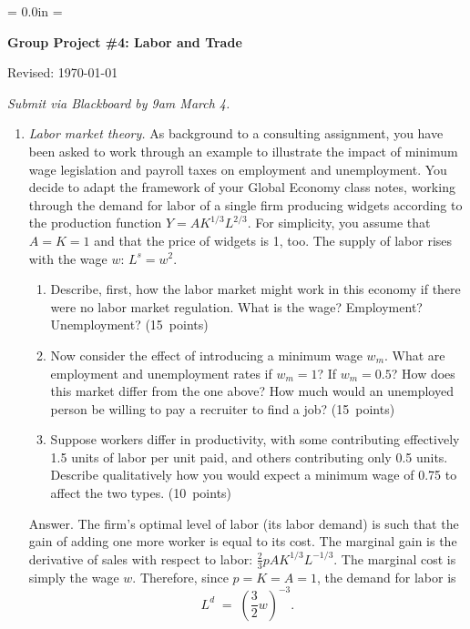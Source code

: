 \documentclass[letterpaper,12pt]{article}
\def\HeadName{Group Project \#4}
\begin{document}
\parindent = 0.0in
\parskip = \bigskipamount
\thispagestyle{empty}%
\Head

\centerline{\large \bf \HeadName:  Labor and Trade}%
\centerline{Revised:  \today}

\medskip
{\it Submit via Blackboard by 9am March 4.}


\begin{enumerate}

\item {\it Labor market theory.\/} As background to a
consulting assignment, you have been asked to work through an
example to illustrate the impact of
minimum wage legislation and payroll taxes on employment and
unemployment. You decide to adapt the framework of your 
{Global Economy} class notes, 
working through the demand for labor
of a single firm producing widgets according to the production
function $Y= A K^{1/3}L^{2/3}$. For simplicity, you assume that
$A=K=1$ and that the price of widgets is 1, too.  The supply of
labor rises with the wage $w$: $L^{s}=w^{2}$.
%
\begin{enumerate}

\item Describe, first, how the labor market might work in this
economy if there were no labor market regulation.  
What is the wage?
Employment? Unemployment?  (15~points)

\item Now consider the effect of introducing a minimum wage
$w_{m}$.  What are employment and unemployment rates if $w_{m}=1$?
If $w_{m}=0.5$?  How does this market differ from the one above?
How much would an unemployed person be willing to pay a recruiter
to find a job?  
(15~points)

\item Suppose workers differ in productivity, 
with some contributing effectively 1.5 units of labor 
per unit paid, and others contributing only 0.5 units.  
Describe qualitatively how  you would expect a minimum wage of 0.75 
to affect the two types.  
(10~points)

\end{enumerate}

Answer. The firm's optimal level of labor (its labor demand) is
such that the gain of adding one more worker is equal to its cost.
The marginal gain is the derivative of sales with respect to
labor: $\frac{2}{3}pAK^{1/3}L^{-1/3}$. The marginal cost is simply
the wage $w$. Therefore, since $p=K=A=1$, the demand for labor is
\[
    L^{d} \;=\; \left(\frac{3}{2}w\right)^{-3}.
\] 


\end{enumerate}
\end{document}
